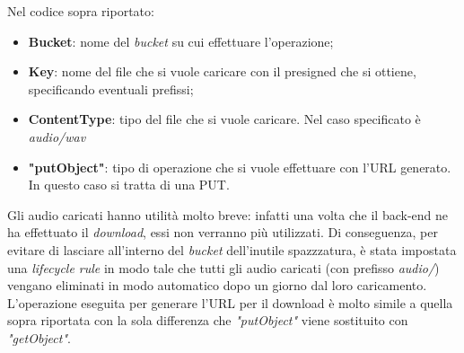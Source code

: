 		Nel codice sopra riportato:
		\begin{itemize}
			\item \textbf{Bucket}: nome del \emph{bucket} su cui effettuare l'operazione;
			\item \textbf{Key}: nome del file che si vuole caricare con il presigned che si ottiene, specificando eventuali prefissi;
			\item \textbf{ContentType}: tipo del file che si vuole caricare. Nel caso specificato è \emph{audio/wav}
			\item \textbf{"putObject"}: tipo di operazione che si vuole effettuare con l'URL generato. In questo caso si tratta di una PUT.
		\end{itemize}
		
		Gli audio caricati hanno utilità molto breve: infatti una volta che il back-end ne ha effettuato il \emph{download}, 
		essi non verranno più utilizzati. Di conseguenza, per evitare di lasciare all'interno del \emph{bucket} dell'inutile spazzzatura, è stata impostata una \emph{lifecycle rule} in modo tale che tutti gli audio caricati (con prefisso \emph{audio/}) vengano eliminati in modo automatico dopo un giorno dal loro caricamento. \\
		
		\noindent  L'operazione eseguita per generare l'URL per il download è molto simile a quella sopra riportata con la sola differenza che \emph{"putObject"} viene sostituito con \emph{"getObject"}.
	
